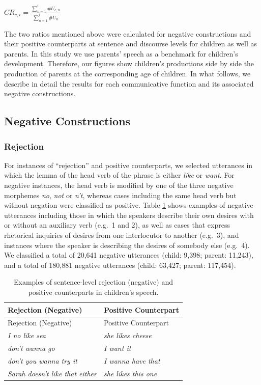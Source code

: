 \documentclass[
  english,
  man,floatsintext]{apa6}
\begin{document}
\(CR_{c, i} = \frac{\sum_{n=1}^{i} \#U_{c,n}}{\sum_{n=1}^{i} \#U_{n}}\)

The two ratios mentioned above were calculated for negative constructions and their positive counterparts at sentence and discourse levels for children as well as parents. In this study we use parents' speech as a benchmark for children's development. Therefore, our figures show children's productions side by side the production of parents at the corresponding age of children. In what follows, we describe in detail the results for each communicative function and its associated negative constructions.

\hypertarget{negative-constructions}{%
\subsection{Negative Constructions}\label{negative-constructions}}

\hypertarget{rejection}{%
\subsubsection{Rejection}\label{rejection}}

For instances of ``rejection'' and positive counterparts, we selected utterances in which the lemma of the head verb of the phrase is either \emph{like} or \emph{want}. For negative instances, the head verb is modified by one of the three negative morphemes \emph{no}, \emph{not} or \emph{n't}, whereas cases including the same head verb but without negation were classified as positive. Table \ref{tab:rejection} shows examples of negative utterances including those in which the speakers describe their own desires with or without an auxiliary verb (e.g.~1 and 2), as well as cases that express rhetorical inquiries of desires from one interlocutor to another (e.g.~3), and instances where the speaker is describing the desires of somebody else (e.g.~4). We classified a total of 20,641 negative utterances (child: 9,398; parent: 11,243), and a total of 180,881 negative utterances (child: 63,427; parent: 117,454).

\begin{longtable}[]{@{}ll@{}}
\caption{\label{tab:rejection} Examples of sentence-level rejection (negative) and positive counterparts in children's speech.}\tabularnewline
\toprule
Rejection (Negative) & Positive Counterpart \\
\midrule
\endfirsthead
\toprule
Rejection (Negative) & Positive Counterpart \\
\midrule
\endhead
\emph{I no like sea} & \emph{she likes cheese} \\
\emph{don't wanna go} & \emph{I want it} \\
\emph{don't you wanna try it} & \emph{I wanna have that} \\
\emph{Sarah doesn't like that either} & \emph{she likes this one} \\
\bottomrule
\end{longtable}
\end{document}
